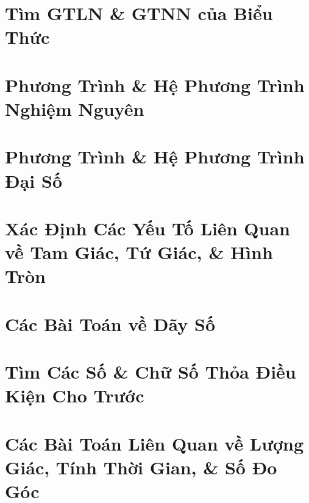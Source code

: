 \documentclass{article}
\begin{document}
\section{Tìm GTLN \& GTNN của Biểu Thức}


\section{Phương Trình \& Hệ Phương Trình Nghiệm Nguyên}


\section{Phương Trình \& Hệ Phương Trình Đại Số}


\section{Xác Định Các Yếu Tố Liên Quan về Tam Giác, Tứ Giác, \& Hình Tròn}


\section{Các Bài Toán về Dãy Số}


\section{Tìm Các Số \& Chữ Số Thỏa Điều Kiện Cho Trước}


\section{Các Bài Toán Liên Quan về Lượng Giác, Tính Thời Gian, \& Số Đo Góc}

\end{document}

